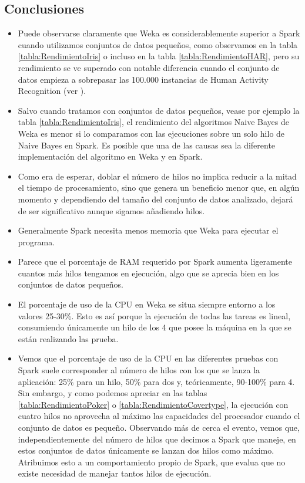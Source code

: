 \subsection{Conclusiones}\label{ConclusionesWekaSpark}
\begin{itemize}
	\item Puede observarse claramente que Weka es considerablemente superior a Spark cuando utilizamos conjuntos de datos pequeños, como observamos en la tabla \ref{tabla:RendimientoIris} o incluso en la tabla \ref{tabla:RendimientoHAR}, pero su rendimiento se ve superado con notable diferencia cuando el conjunto de datos empieza a sobrepasar las 100.000 instancias de Human Activity Recognition (ver ).
	\item Salvo cuando tratamos con conjuntos de datos pequeños, vease por ejemplo la tabla \ref{tabla:RendimientoIris}, el rendimiento del algoritmos Naive Bayes de Weka es menor si lo comparamos con las ejecuciones sobre un solo hilo de Naive Bayes en Spark. Es posible que una de las causas sea la diferente implementación del algoritmo en Weka y en Spark.
	\item Como era de esperar, doblar el número de hilos no implica reducir a la mitad el tiempo de procesamiento, sino que genera un beneficio menor que, en algún momento y dependiendo del tamaño del conjunto de datos analizado, dejará de ser significativo aunque sigamos añadiendo hilos.
	\item Generalmente Spark necesita menos memoria que Weka para ejecutar el programa.
	\item Parece que el porcentaje de RAM requerido por Spark aumenta ligeramente cuantos más hilos tengamos en ejecución, algo que se aprecia bien en los conjuntos de datos pequeños.
	\item El porcentaje de uso de la CPU en Weka se situa siempre entorno a los valores 25-30\%. Esto es así porque la ejecución de todas las tareas es lineal, consumiendo únicamente un hilo de los 4 que posee la máquina en la que se están realizando las prueba.
	\item Vemos que el porcentaje de uso de la CPU en las diferentes pruebas con Spark suele corresponder al número de hilos con los que se lanza la aplicación: 25\% para un hilo, 50\% para dos y, teóricamente, 90-100\% para 4. Sin embargo, y como podemos apreciar en las tablas \ref{tabla:RendimientoPoker} o \ref{tabla:RendimientoCovertype}, la ejecución con cuatro hilos no aprovecha al máximo las capacidades del procesador cuando el conjunto de datos es pequeño. Observando más de cerca el evento, vemos que, independientemente del número de hilos que decimos a Spark que maneje, en estos conjuntos de datos únicamente se lanzan dos hilos como máximo. Atribuimos esto a un comportamiento propio de Spark, que evalua que no existe necesidad de manejar tantos hilos de ejecución. 
\end{itemize}


